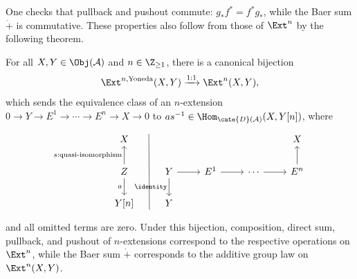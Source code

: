 One checks that pullback and pushout commute:
$g_*f^*=f^*g_*$, while the Baer sum $\dot{+}$ is commutative. These
properties also follow from those of $\Ext^n$ by the following theorem.

\begin{theorem}\label{prop:Yoneda-Ext}
	For all $X,Y\in\Obj(\mathcal{A})$ and $n\in\Z_{\geq1}$, there is a
	canonical bijection
	\[ \Ext^{n,\text{Yoneda}}(X,Y) \xrightarrow{1:1} \Ext^n(X,Y), \]
	which sends the equivalence class of an $n$-extension
	$0\to Y\to E^1\to\cdots\to E^n\to X\to0$ to
	$as^{-1}\in\Hom_{\cate{D}(\mathcal{A})}(X,Y[n])$, where
	\[\begin{tikzcd}
		X \arrow[phantom, r, "" {name=A, yshift=2ex}] & {} & & & X \\
		Z \arrow[u, "{s: \text{quasi-isomorphism}}"] \arrow[d, "a"'] & Y \arrow[r] \arrow[d, "\identity"'] & E^1 \arrow[r] & \cdots \arrow[r] & E^n \arrow[u] \\
		Y[n] \arrow[phantom, r, "" {name=B, yshift=-2ex}] & Y & & &
		\arrow[dash, from=A, to=B]
	\end{tikzcd}\]
	and all omitted terms are zero. Under this bijection, composition,
	direct sum, pullback, and pushout of $n$-extensions correspond to the
	respective operations on $\Ext^n$, while the Baer sum $\dot{+}$
	corresponds to the additive group law on $\Ext^n(X,Y)$.
\end{theorem}

